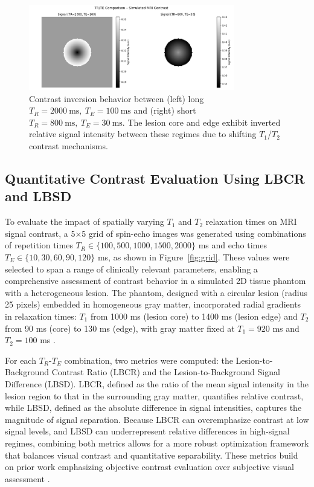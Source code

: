 \documentclass[10pt,a4paper,twoside]{article}
\begin{document}
\begin{figure}[htbp!]
\centering
\includegraphics[width=0.8\textwidth]{figures/trtecomparisonforcontrast.png}
\caption{Contrast inversion behavior between (left) long \( T_R = 2000 \ \mathrm{ms},\ T_E = 100 \ \mathrm{ms} \) and (right) short \( T_R = 800 \ \mathrm{ms},\ T_E = 30 \ \mathrm{ms} \). The lesion core and edge exhibit inverted relative signal intensity between these regimes due to shifting $T_1$/$T_2$ contrast mechanisms.}
\label{fig:inversion}
\end{figure}

\subsection{Quantitative Contrast Evaluation Using LBCR and LBSD}

To evaluate the impact of spatially varying \( T_1 \) and \( T_2 \) relaxation times on MRI signal contrast, a 5×5 grid of spin-echo images was generated using combinations of repetition times \( T_R \in \{100, 500, 1000, 1500, 2000\} \) ms and echo times \( T_E \in \{10, 30, 60, 90, 120\} \) ms, as shown in Figure~\ref{fig:grid}. These values were selected to span a range of clinically relevant parameters, enabling a comprehensive assessment of contrast behavior in a simulated 2D tissue phantom with a heterogeneous lesion. The phantom, designed with a circular lesion (radius 25 pixels) embedded in homogeneous gray matter, incorporated radial gradients in relaxation times: \( T_1 \) from 1000 ms (lesion core) to 1400 ms (lesion edge) and \( T_2 \) from 90 ms (core) to 130 ms (edge), with gray matter fixed at \( T_1 = 920 \) ms and \( T_2 = 100 \) ms \cite{stanisz2005, bojorquez2017}.

For each \( T_R \)-\( T_E \) combination, two metrics were computed: the Lesion-to-Background Contrast Ratio (LBCR) and the Lesion-to-Background Signal Difference (LBSD). LBCR, defined as the ratio of the mean signal intensity in the lesion region to that in the surrounding gray matter, quantifies relative contrast, while LBSD, defined as the absolute difference in signal intensities, captures the magnitude of signal separation. Because LBCR can overemphasize contrast at low signal levels, and LBSD can underrepresent relative differences in high-signal regimes, combining both metrics allows for a more robust optimization framework that balances visual contrast and quantitative separability. These metrics build on prior work emphasizing objective contrast evaluation over subjective visual assessment \cite{dewilde1997, mustafa2021}.
\end{document}
